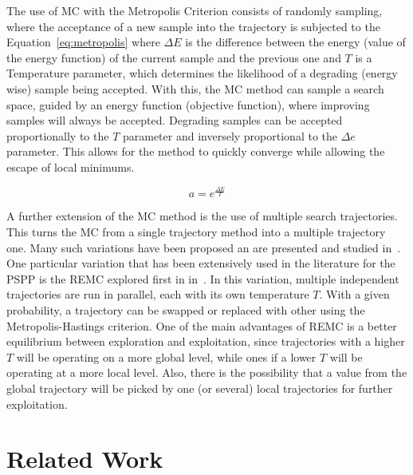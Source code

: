 The use of \ac{MC} with the Metropolis Criterion consists of randomly sampling,
where the acceptance of a new sample into the trajectory is subjected to
the Equation~\eqref{eq:metropolis} where $\Delta E$ is the difference
between the energy (value of the energy function) of the current sample and
the previous one and $T$ is a Temperature parameter, which determines the
likelihood of a degrading (energy wise) sample being accepted. With this,
the \ac{MC} method can sample a search space, guided by an energy function
(objective function), where improving samples will always be accepted.
Degrading samples can be accepted proportionally to the $T$ parameter
and inversely proportional to the $\Delta e$ parameter. This allows
for the method to quickly converge while allowing the escape
of local minimums.

\begin{equation} \label{eq:metropolis}
    a = e^\frac{\Delta E}{T}
\end{equation}

A further extension of the \ac{MC} method is the use of multiple
search trajectories. This turns the \ac{MC} from a single trajectory
method into a multiple trajectory one. Many such variations
have been proposed an are presented and studied in~\cite{iba2001extended}.
One particular variation that has been extensively used
in the literature for the PSPP is the \ac{REMC}
explored first in in~\cite{swendsen1986replica}. In this variation,
multiple independent trajectories are run in parallel, each
with its own temperature $T$. With a given probability, a trajectory
can be swapped or replaced with other using the Metropolis-Hastings
criterion. One of the main advantages of \ac{REMC} is a better equilibrium
between exploration and exploitation, since trajectories with a higher
$T$ will be operating on a more global level, while ones if a lower $T$
will be operating at a more local level. Also, there is the possibility
that a value from the global trajectory will be picked by one (or several)
local trajectories for further exploitation.


\section{Related Work}~\label{sec:related_works} 


